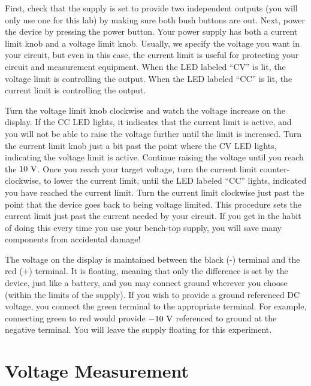 First, check that the supply is set to provide two independent outputs
(you will only use one for this lab) by making sure both bush buttons
are out.  Next, power the device by pressing the power button.  Your
power supply has both a current limit knob and a voltage limit knob.
Usually, we specify the voltage you want in your circuit, but even in
this case, the current limit is useful for protecting your circuit and
measurement equipment.  When the LED labeled ``CV'' is lit, the
voltage limit is controlling the output.  When the LED labeled ``CC''
is lit, the current limit is controlling the output.

Turn the voltage limit knob clockwise and watch the voltage increase
on the display.  If the CC LED lights, it indicates that the current
limit is active, and you will not be able to raise the voltage further
until the limit is increased.  Turn the current limit knob just a bit
past the point where the CV LED lights, indicating the voltage limit
is active.  Continue raising the voltage until you reach the $10~\rm
V$.  Once you reach your target voltage, turn the current limit
counter-clockwise, to lower the current limit, until the LED labeled
``CC'' lights, indicated you have reached the current limit.  Turn the
current limit clockwise just past the point that the device goes back
to being voltage limited.  This procedure sets the current limit just
past the current needed by your circuit.  If you get in the habit of
doing this every time you use your bench-top supply, you will save
many components from accidental damage!

The voltage on the display is maintained between the black (-)
terminal and the red (+) terminal.  It is floating, meaning that only
the difference is set by the device, just like a battery, and you may
connect ground wherever you choose (within the limits of the supply).
If you wish to provide a ground referenced DC voltage, you connect the
green terminal to the appropriate terminal.  For example, connecting
green to red would provide $-10~\rm V$ referenced to ground at the
negative terminal.  You will leave the supply floating for this
experiment.

\section{Voltage Measurement}

